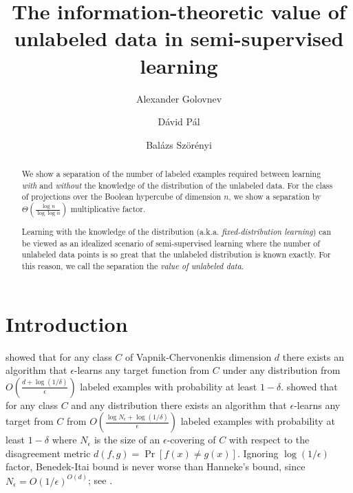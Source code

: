 \documentclass[10pt]{article}
\begin{document}
\title{The information-theoretic value of unlabeled data in semi-supervised learning}
\author{Alexander Golovnev \and D\'avid P\'al \and Bal\'azs Sz\"or\'enyi}

\maketitle

\begin{abstract}
We show a separation of the number of labeled examples required between learning \emph{with}
and \emph{without} the knowledge of the distribution of the unlabeled data. For
the class of projections over the Boolean hypercube of dimension $n$, we show a
separation by $\Theta(\frac{\log n}{\log \log n})$ multiplicative factor.

Learning with the knowledge of the distribution (a.k.a. \emph{fixed-distribution
learning}) can be viewed as an idealized scenario of semi-supervised learning
where the number of unlabeled data points is so great that the unlabeled
distribution is known exactly. For this reason, we call the separation
the \emph{value of unlabeled data}.
\end{abstract}


\section{Introduction}

\cite{Hanneke-2016} showed that for any class $C$ of Vapnik-Chervonenkis
dimension $d$ there exists an algorithm that $\epsilon$-learns any target
function from $C$ under any distribution from $O\left(\frac{d +
\log(1/\delta)}{\epsilon}\right)$ labeled examples with probability at least
$1-\delta$. \cite{Benedek-Itai-1991} showed that for any class $C$ and any
distribution there exists an algorithm that $\epsilon$-learns any target from
$C$ from $O \left( \frac{\log N_\epsilon + \log (1/\delta)}{\epsilon}\right)$ labeled
examples with probability at least $1-\delta$ where $N_\epsilon$ is the size of an
$\epsilon$-covering of $C$ with respect to the disagreement metric $d(f,g) =
\Pr[f(x) \neq g(x)]$. Ignoring $\log(1/\epsilon)$ factor, Benedek-Itai bound
is never worse than Hanneke's bound, since $N_\epsilon = O(1/\epsilon)^{O(d)}$; see
\cite{Dudley-1978}.
\end{document}
